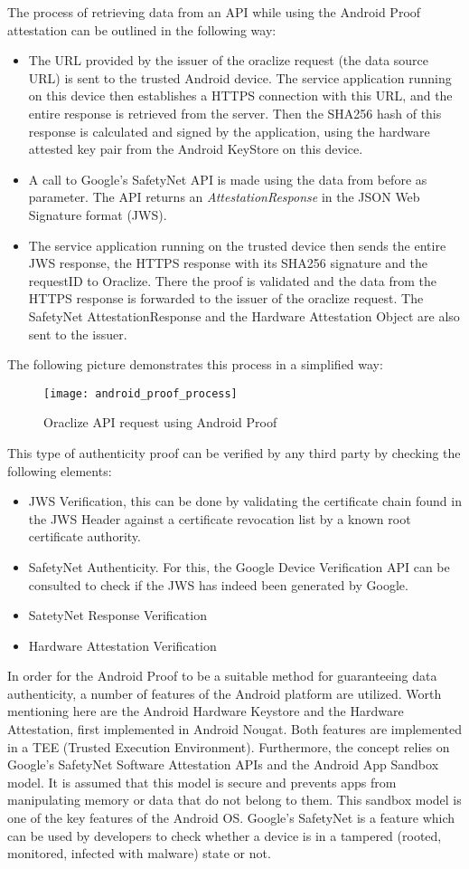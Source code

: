 The process of retrieving data from an API while using the Android Proof attestation can be outlined in the following way\cite{androidproof}:
\begin{itemize}
	\item The URL provided by the issuer of the oraclize request (the data source URL) is sent to the trusted Android device. The service application running on this device then establishes a HTTPS connection with this URL, and the entire response is retrieved from the server. Then the SHA256 hash of this response is calculated and signed by the application, using the hardware attested key pair from the Android KeyStore on this device.
	\item A call to Google's SafetyNet API is made using the data from before as parameter. The API returns an \emph{AttestationResponse} in the JSON Web Signature format (JWS).
	\item The service application running on the trusted device then sends the entire JWS response, the HTTPS response with its SHA256 signature and the requestID to Oraclize. There the proof is validated and the data from the HTTPS response is forwarded to the issuer of the oraclize request. The SafetyNet AttestationResponse and the Hardware Attestation Object are also sent to the issuer.
\end{itemize}

The following picture demonstrates this process in a simplified way:
\begin{figure}[H]
\centering
\texttt{[image: android\_proof\_process]}
\caption{Oraclize API request using Android Proof\cite{androidproof}}
\end{figure}
This type of authenticity proof can be verified by any third party by checking the following elements:
\begin{itemize}
	\item JWS Verification, this can be done by validating the certificate chain found in the JWS Header against a certificate revocation list by a known root certificate authority.
	\item SafetyNet Authenticity. For this, the Google Device Verification API can be consulted to check if the JWS has indeed been generated by Google.
	\item SatetyNet Response Verification
	\item Hardware Attestation Verification
\end{itemize}

In order for the Android Proof to be a suitable method for guaranteeing data authenticity, a number of features of the Android platform are utilized. Worth mentioning here are the Android Hardware Keystore and the Hardware Attestation, first implemented in Android Nougat. Both features are implemented in a TEE (Trusted Execution Environment). Furthermore, the concept relies on Google's SafetyNet Software Attestation APIs and the Android App Sandbox model. It is assumed that this model is secure and prevents apps from manipulating memory or data that do not belong to them. This sandbox model is one of the key features of the Android OS. Google's SafetyNet is a feature which can be used by developers to check whether a device is in a tampered (rooted, monitored, infected with malware) state or not.

